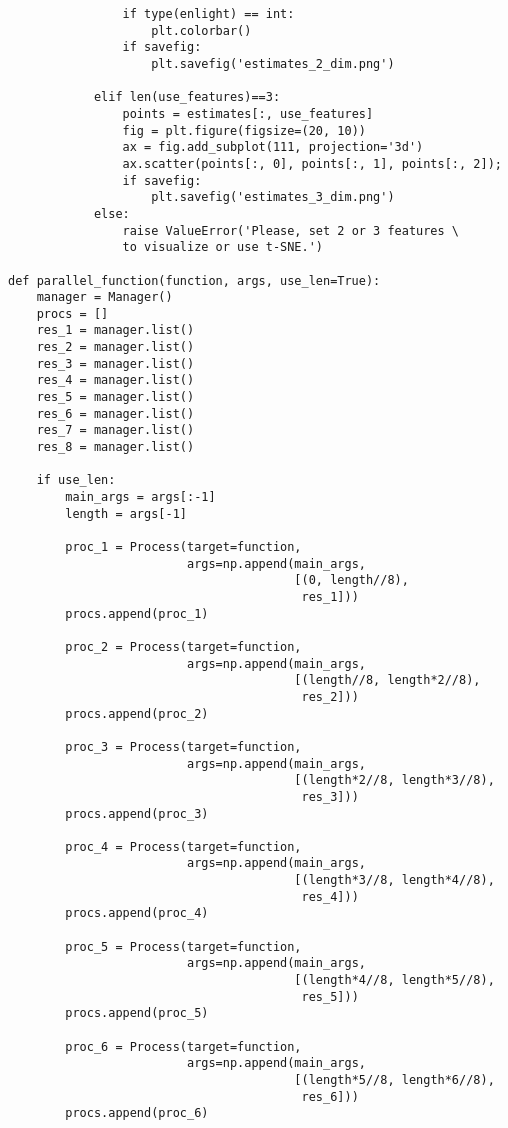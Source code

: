 \documentclass[a4paper, 12pt]{extreport}
\begin{document}
\begin{verbatim}
                if type(enlight) == int:
                    plt.colorbar()
                if savefig:
                    plt.savefig('estimates_2_dim.png')

            elif len(use_features)==3:
                points = estimates[:, use_features]
                fig = plt.figure(figsize=(20, 10))
                ax = fig.add_subplot(111, projection='3d')
                ax.scatter(points[:, 0], points[:, 1], points[:, 2]);
                if savefig:
                    plt.savefig('estimates_3_dim.png')
            else:
                raise ValueError('Please, set 2 or 3 features \
                to visualize or use t-SNE.')

def parallel_function(function, args, use_len=True):
    manager = Manager()
    procs = []
    res_1 = manager.list()
    res_2 = manager.list()
    res_3 = manager.list()
    res_4 = manager.list()
    res_5 = manager.list()
    res_6 = manager.list()
    res_7 = manager.list()
    res_8 = manager.list()

    if use_len:
        main_args = args[:-1]
        length = args[-1]

        proc_1 = Process(target=function,
                         args=np.append(main_args,
                                        [(0, length//8),
                                         res_1]))
        procs.append(proc_1)

        proc_2 = Process(target=function,
                         args=np.append(main_args,
                                        [(length//8, length*2//8),
                                         res_2]))
        procs.append(proc_2)

        proc_3 = Process(target=function,
                         args=np.append(main_args,
                                        [(length*2//8, length*3//8),
                                         res_3]))
        procs.append(proc_3)

        proc_4 = Process(target=function,
                         args=np.append(main_args,
                                        [(length*3//8, length*4//8),
                                         res_4]))
        procs.append(proc_4)

        proc_5 = Process(target=function,
                         args=np.append(main_args,
                                        [(length*4//8, length*5//8),
                                         res_5]))
        procs.append(proc_5)

        proc_6 = Process(target=function,
                         args=np.append(main_args,
                                        [(length*5//8, length*6//8),
                                         res_6]))
        procs.append(proc_6)


\end{verbatim}
\end{document}
